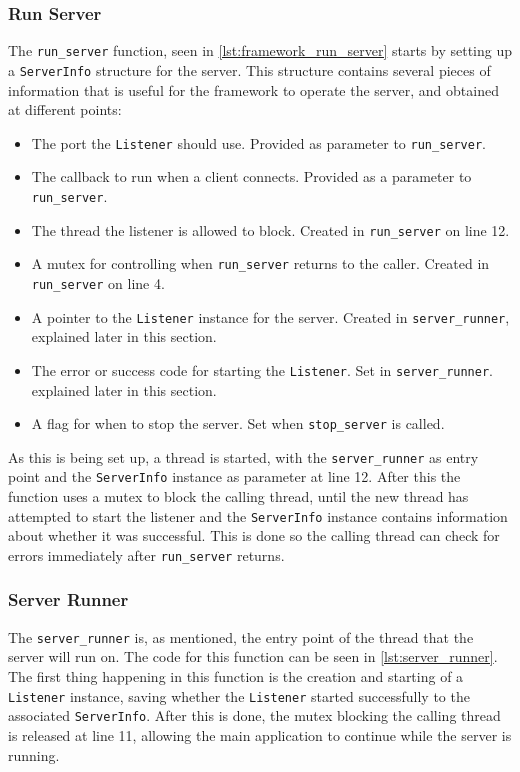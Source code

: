 \subsubsection{Run Server}
The \lstinline|run_server| function, seen in \autoref{lst:framework_run_server} starts by setting up a \lstinline|ServerInfo| structure for the server. This structure contains several
pieces of information that is useful for the framework to operate the server, and obtained at different points:
\begin{itemize}
\item The port the \lstinline|Listener| should use. Provided as parameter to \lstinline|run_server|.
\item The callback to run when a client connects. Provided as a parameter to \lstinline|run_server|.
\item The thread the listener is allowed to block. Created in \lstinline|run_server| on line 12.
\item A mutex for controlling when \lstinline|run_server| returns to the caller. Created in \lstinline|run_server| on line 4.
\item A pointer to the \lstinline|Listener| instance for the server. Created in \lstinline|server_runner|, explained later in this section.
\item The error or success code for starting the \lstinline|Listener|. Set in \lstinline|server_runner|. explained later in this section.
\item A flag for when to stop the server. Set when \lstinline|stop_server| is called.
\end{itemize}
As this is being set up, a thread is started, with the \lstinline|server_runner| as entry point and the \lstinline|ServerInfo| instance as parameter at line 12. After this the function uses a mutex
to block the calling thread, until the new thread has attempted to start the listener and the \lstinline|ServerInfo| instance contains information about whether it was successful.
This is done so the calling thread can check for errors immediately after \lstinline|run_server| returns.



\subsubsection{Server Runner}
The \lstinline|server_runner| is, as mentioned, the entry point of the thread that the server will run on. The code for this function can be seen in \autoref{lst:server_runner}.
The first thing happening in this function is the creation and starting of a \lstinline|Listener| instance, saving whether the \lstinline|Listener| started successfully to the associated \lstinline|ServerInfo|.
After this is done, the mutex blocking the calling thread is released at line 11, allowing the main application to continue while the server is running.

